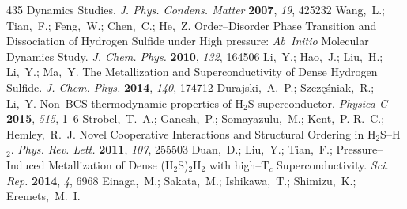 \documentclass[12pt,letterpaper,oneside]{article}
\begin{document}
\begin{mcitethebibliography}{435}
  Dynamics Studies. \emph{J. Phys. Condens. Matter} \textbf{2007}, \emph{19},
  425232\relax
\mciteBstWouldAddEndPuncttrue
\mciteSetBstMidEndSepPunct{\mcitedefaultmidpunct}
{\mcitedefaultendpunct}{\mcitedefaultseppunct}\relax
\EndOfBibitem
{}
Wang,~L.; Tian,~F.; Feng,~W.; Chen,~C.; He,~Z. Order--Disorder Phase Transition
  and Dissociation of Hydrogen Sulfide under High pressure: \emph{Ab~Initio}
  Molecular Dynamics Study. \emph{J. Chem. Phys.} \textbf{2010}, \emph{132},
  164506\relax
\mciteBstWouldAddEndPuncttrue
\mciteSetBstMidEndSepPunct{\mcitedefaultmidpunct}
{\mcitedefaultendpunct}{\mcitedefaultseppunct}\relax
\EndOfBibitem
{}
Li,~Y.; Hao,~J.; Liu,~H.; Li,~Y.; Ma,~Y. The Metallization and
  Superconductivity of Dense Hydrogen Sulfide. \emph{J. Chem. Phys.}
  \textbf{2014}, \emph{140}, 174712\relax
\mciteBstWouldAddEndPuncttrue
\mciteSetBstMidEndSepPunct{\mcitedefaultmidpunct}
{\mcitedefaultendpunct}{\mcitedefaultseppunct}\relax
\EndOfBibitem
{}
Durajski,~A.~P.; Szcz{\k e}{\'s}niak,~R.; Li,~Y. Non--BCS thermodynamic
  properties of H$_2$S superconductor. \emph{Physica C} \textbf{2015},
  \emph{515}, 1--6\relax
\mciteBstWouldAddEndPuncttrue
\mciteSetBstMidEndSepPunct{\mcitedefaultmidpunct}
{\mcitedefaultendpunct}{\mcitedefaultseppunct}\relax
\EndOfBibitem
{}
Strobel,~T.~A.; Ganesh,~P.; Somayazulu,~M.; Kent,~P. R.~C.; Hemley,~R.~J. Novel
  Cooperative Interactions and Structural Ordering in H$_2$S--H$_2$.
  \emph{Phys. Rev. Lett.} \textbf{2011}, \emph{107}, 255503\relax
\mciteBstWouldAddEndPuncttrue
\mciteSetBstMidEndSepPunct{\mcitedefaultmidpunct}
{\mcitedefaultendpunct}{\mcitedefaultseppunct}\relax
\EndOfBibitem
{}
Duan,~D.; Liu,~Y.; Tian,~F.; 
  Pressure--Induced Metallization of Dense (H$_2$S)$_2$H$_2$ with high--T$_c$
  Superconductivity. \emph{Sci. Rep.} \textbf{2014}, \emph{4}, 6968\relax
\mciteBstWouldAddEndPuncttrue
\mciteSetBstMidEndSepPunct{\mcitedefaultmidpunct}
{\mcitedefaultendpunct}{\mcitedefaultseppunct}\relax
\EndOfBibitem
{}
Einaga,~M.; Sakata,~M.; Ishikawa,~T.; Shimizu,~K.; Eremets,~M.~I.

\end{mcitethebibliography}
\end{document}
